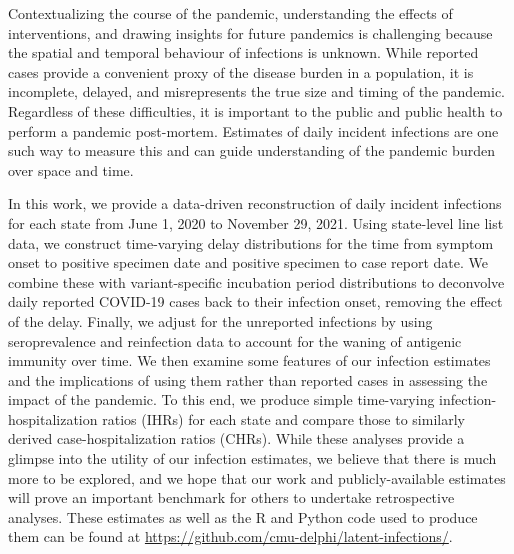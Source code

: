Contextualizing the course of the pandemic, understanding the effects of
interventions, and drawing insights for future pandemics is challenging because
the spatial and temporal behaviour of infections is unknown. While reported
cases provide a convenient proxy of the disease burden in a population, it is
incomplete, delayed, and misrepresents the true size and timing of the pandemic.
Regardless of these difficulties, it is important to the public and public
health to perform a pandemic post-mortem. Estimates of daily incident infections
are one such way to measure this and can guide understanding of the pandemic
burden over space and time. 

In this work, we provide a data-driven reconstruction of daily incident
infections for each \US state from June 1, 2020 to November 29, 2021. Using
state-level line list data, we construct time-varying delay distributions for
the time from symptom onset to positive specimen date and positive specimen to
case report date. We combine these with variant-specific incubation period
distributions to deconvolve daily reported COVID-19 cases back to their
infection onset, removing the effect of the delay. Finally, we adjust for the
unreported infections by using seroprevalence and reinfection data to account
for the waning of antigenic immunity over time. We then examine some features of
our infection estimates and the implications of using them rather than reported
cases in assessing the impact of the pandemic. To this end, we produce simple
time-varying infection-hospitalization ratios (IHRs) for each state and compare
those to similarly derived case-hospitalization ratios (CHRs). While these
analyses provide a glimpse into the utility of our infection estimates, we
believe that there is much more to be explored, and we hope that our work and
publicly-available estimates will prove an important benchmark for others to
undertake retrospective analyses. These estimates as well as the R and Python
code used to produce them can be found at
\href{https://github.com/cmu-delphi/latent-infections/}{https://github.com/cmu-delphi/latent-infections/}.

